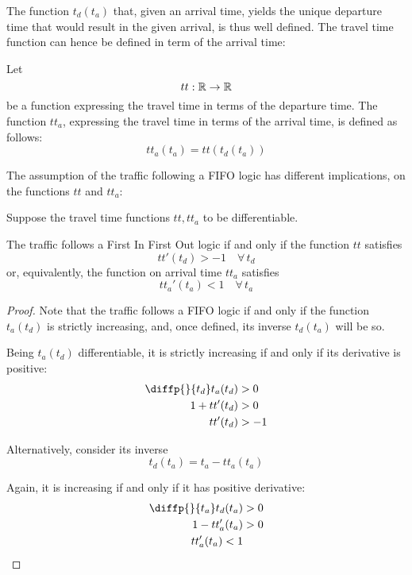 The function \(t_d(t_a)\) that, given an arrival time,
yields the unique departure time that would result in the given arrival,
is thus well defined.
The travel time function can hence be defined in term of the arrival time:
\begin{definition}
  \label{def:tta}
  Let
  \begin{equation*}
    tt:\mathbb{R} \rightarrow \mathbb{R}
  \end{equation*}
  be a function expressing the travel time in terms of the departure time.
  The function \(tt_a\), expressing the travel time in terms of the arrival time, is defined as follows:
  \begin{equation*}
    tt_a(t_a) = tt(t_d(t_a))
  \end{equation*}
\end{definition}

The assumption of the traffic following a FIFO logic has different implications,
on the functions \(tt\) and \(tt_a\):

\begin{lemma}
  \label{lemma:bounded-der-tt}
  Suppose the travel time functions \(tt, tt_a\) to be differentiable.
  
  The traffic follows a First In First Out logic if and only if the function \(tt\) satisfies
  \begin{equation*}
    tt'(t_d) > -1\quad \forall \, t_d
  \end{equation*}
  or, equivalently, the function on arrival time \(tt_a\) satisfies
  \begin{equation*}
    tt_a'(t_a) < 1\quad \forall \, t_a
  \end{equation*}
\end{lemma}
\begin{proof}
  Note that the traffic follows a FIFO logic if and only if the function \(t_a(t_d)\) is strictly increasing,
  and, once defined, its inverse \(t_d(t_a)\) will be so.
  
  Being \(t_a(t_d)\) differentiable, it is strictly increasing if and only if its derivative is positive:
  \begin{align*}
    \diffp{}{{t_d}} t_a(t_d) & > 0 \\
    1 + tt'(t_d) & > 0 \\
    tt'(t_d) & > -1
  \end{align*}
  
  Alternatively, consider its inverse
  \begin{equation*}
    t_d(t_a) = t_a - tt_a(t_a)
  \end{equation*}

  Again, it is increasing if and only if it has positive derivative:
  \begin{align*}
    \diffp{}{{t_a}} t_d(t_a) & > 0 \\
    1 - tt_a'(t_a) & > 0 \\
    tt_a'(t_a) < 1
  \end{align*}
\end{proof}


